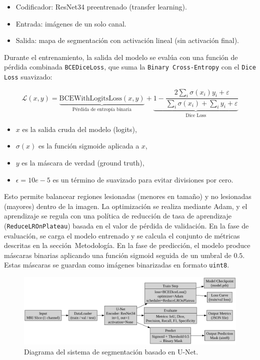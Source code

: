 \documentclass[../main.tex]{subfiles}
\begin{document}
\begin{itemize}
    \item Codificador: ResNet34 preentrenado (transfer learning).
    \item Entrada: imágenes de un solo canal.
    \item Salida: mapa de segmentación con activación lineal (sin activación final).
\end{itemize}
    
Durante el entrenamiento, la salida del modelo se evalúa con una función de pérdida combinada \texttt{BCEDiceLoss}, que suma la \texttt{Binary Cross-Entropy} con el \texttt{Dice Loss} suavizado:

\begin{equation}
\mathcal{L}(x, y) = \underbrace{\text{BCEWithLogitsLoss}(x, y)}_{\text{Pérdida de entropía binaria}} + \underbrace{1 - \frac{2 \sum_i \sigma(x_i) y_i + \varepsilon}{\sum_i \sigma(x_i) + \sum_i y_i + \varepsilon}}_{\text{Dice Loss}}
\end{equation}

\begin{itemize}
    \item $x$ es la salida cruda del modelo (logits),
    \item $\sigma(x)$ es la función sigmoide aplicada a $x$,
    \item $y$ es la máscara de verdad (ground truth),
    \item $\epsilon = 10e-5$ es un término de suavizado para evitar divisiones por cero.
\end{itemize}
    
Esto permite balancear regiones lesionadas (menores en tamaño) y no lesionadas (mayores) dentro de la imagen. La optimización se realiza mediante Adam, y el aprendizaje se regula con una política de reducción de tasa de aprendizaje (\texttt{ReduceLROnPlateau}) basada en el valor de pérdida de validación. En la fase de evaluación, se carga el modelo entrenado y se calcula el conjunto de métricas descritas en la sección~Metodología. En la fase de predicción, el modelo produce máscaras binarias aplicando una función sigmoid seguida de un umbral de $0.5$. Estas máscaras se guardan como imágenes binarizadas en formato \texttt{uint8}.

\begin{figure}
    \centering
    \includegraphics[width=1\linewidth]{imgs/impl/unet.png}
    \caption{Diagrama del sistema de segmentación basado en U-Net.}
    \label{fig:unet-impl-arquitectura}
\end{figure}
\end{document}
